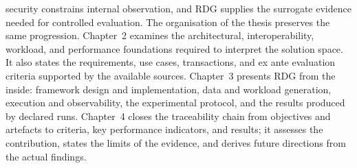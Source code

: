 security constrains internal observation, and RDG supplies the surrogate evidence
needed for controlled evaluation. The organisation of the thesis preserves the same progression. Chapter~2
examines the architectural, interoperability, workload, and performance
foundations required to interpret the solution space. It also states the
requirements, use cases, transactions, and ex ante evaluation criteria supported
by the available sources. Chapter~3 presents RDG from the inside: framework
design and implementation, data and workload generation, execution and
observability, the experimental protocol, and the results produced by declared
runs. Chapter~4 closes the traceability chain from objectives and artefacts to
criteria, key performance indicators, and results; it assesses the contribution,
states the limits of the evidence, and derives future directions from the actual
findings.
\endgroup
\newpage
